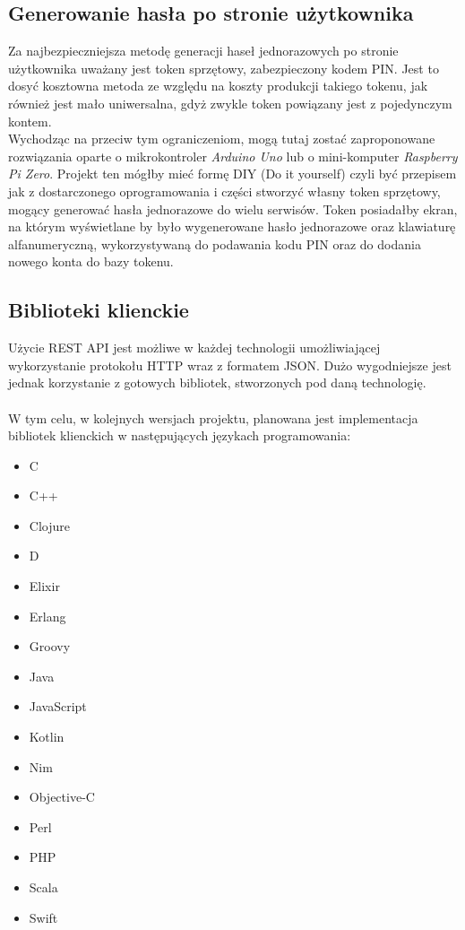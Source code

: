 \subsection{Generowanie hasła po stronie użytkownika}
Za najbezpieczniejsza metodę generacji haseł jednorazowych po stronie użytkownika uważany jest 
token sprzętowy, zabezpieczony kodem PIN. 
Jest to dosyć kosztowna metoda ze względu na koszty produkcji takiego tokenu, jak również 
jest mało uniwersalna, gdyż zwykle token powiązany jest z pojedynczym kontem. \\
Wychodząc na przeciw tym ograniczeniom, mogą tutaj zostać zaproponowane rozwiązania 
oparte o mikrokontroler \textit{Arduino Uno} lub o mini-komputer \textit{Raspberry Pi Zero}.
Projekt ten mógłby mieć formę DIY (Do it yourself) czyli być przepisem jak z dostarczonego 
oprogramowania i części stworzyć własny token sprzętowy, mogący generować hasła jednorazowe do wielu serwisów. 
Token posiadałby ekran, na którym wyświetlane by było wygenerowane hasło jednorazowe oraz klawiaturę 
alfanumeryczną, wykorzystywaną do podawania kodu PIN oraz do dodania nowego konta do bazy tokenu.

\subsection{Biblioteki klienckie}
Użycie REST API jest możliwe w każdej technologii umożliwiającej wykorzystanie protokołu HTTP 
wraz z formatem JSON. 
Dużo wygodniejsze jest jednak korzystanie z gotowych bibliotek, stworzonych pod daną technologię. \\ \\
W tym celu, w kolejnych wersjach projektu, planowana jest implementacja bibliotek klienckich w następujących 
językach programowania:
\begin{itemize}
	\item{C}
	\item{C++}
	\item{Clojure}
	\item{D}
	\item{Elixir}
	\item{Erlang}
	\item{Groovy}
	\item{Java}
	\item{JavaScript}
	\item{Kotlin}
	\item{Nim}
	\item{Objective-C}
	\item{Perl}
	\item{PHP}
	\item{Scala}
	\item{Swift}
\end{itemize}

